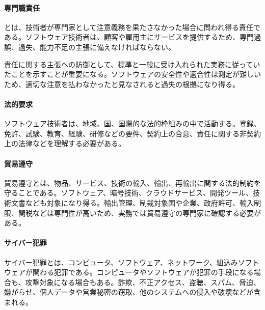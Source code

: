 \paragraph*{専門職責任}


とは、技術者が専門家として注意義務を果たさなかった場合に問われ得る責任である。ソフトウェア技術者は、顧客や雇用主にサービスを提供するため、専門過誤、過失、能力不足の主張に備えなければならない。

責任に関する主張への防御として、標準と一般に受け入れられた実務に従っていたことを示すことが重要になる。ソフトウェアの安全性や適合性は測定が難しいため、適切な注意を払わなかったと見なされると過失の根拠になり得る。

\paragraph*{法的要求}


ソフトウェア技術者は、地域、国、国際的な法的枠組みの中で活動する。登録、免許、試験、教育、経験、研修などの要件、契約上の合意、責任に関する非契約上の法律などを理解する必要がある。

\paragraph*{貿易遵守}


貿易遵守とは、物品、サービス、技術の輸入、輸出、再輸出に関する法的制約を守ることである。ソフトウェア、暗号技術、クラウドサービス、開発ツール、技術文書なども対象になり得る。輸出管理、制裁対象国や企業、政府許可、輸入制限、関税などは専門性が高いため、実務では貿易遵守の専門家に確認する必要がある。

\paragraph*{サイバー犯罪}


サイバー犯罪とは、コンピュータ、ソフトウェア、ネットワーク、組込みソフトウェアが関わる犯罪である。コンピュータやソフトウェアが犯罪の手段になる場合も、攻撃対象になる場合もある。詐欺、不正アクセス、盗聴、スパム、脅迫、嫌がらせ、個人データや営業秘密の窃取、他のシステムへの侵入や破壊などが含まれる。

